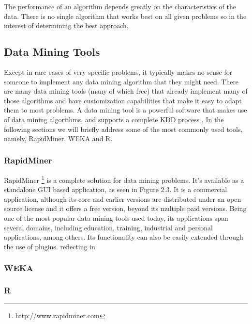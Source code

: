 The performance of an algorithm depends greatly on the characteristics of the data. There is no single algorithm that works best on all given problems \cite{wolpert1995no} so in the interest of determining the best approach, 

\subsection{Data Mining Tools}
Except in rare cases of very specific problems, it typically makes no sense for someone to implement any data mining algorithm that they might need. There are many data mining tools (many of which free) that already implement many of those algorithms and have customization capabilities that make it easy to adapt them to most problems. A data mining tool is a powerful software that makes use of data mining algorithms, and supports a complete KDD process \cite{mikut2011data}. In the following sections we will briefly address some of the most commonly used tools, namely, RapidMiner, WEKA and R.

\subsubsection{RapidMiner}
RapidMiner \footnote{http://www.rapidminer.com} is a complete solution for data mining problems. It’s available as a standalone GUI based application, as seen in Figure 2.3. It is a commercial application, although its core and earlier versions are distributed under an open source license and it offers a free version, beyond its multiple paid versions. Being one of the most popular data mining tools used today, its applications span several domains, including education, training, industrial and personal applications, among others. Its functionality can also be easily extended through the use of plugins. reflecting in

\subsubsection{WEKA}

\subsubsection{R}

